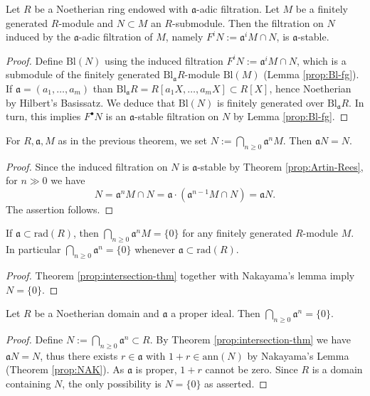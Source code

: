 \begin{theorem}\label{prop:Artin-Rees}
	Let $R$ be a Noetherian ring endowed with $\mathfrak{a}$-adic filtration. Let $M$ be a finitely generated $R$-module and $N \subset M$ an $R$-submodule. Then the filtration on $N$ induced by the $\mathfrak{a}$-adic filtration of $M$, namely $F^i N := \mathfrak{a}^i M \cap N$, is $\mathfrak{a}$-stable.
\end{theorem}
\begin{proof}
	Define $\text{Bl}(N)$ using the induced filtration $F^i N := \mathfrak{a}^i M \cap N$, which is a submodule of the finitely generated $\text{Bl}_{\mathfrak{a}} R$-module $\text{Bl}(M)$ (Lemma \ref{prop:Bl-fg}). If $\mathfrak{a} = (a_1, \ldots, a_m)$ than $\text{Bl}_{\mathfrak{a}} R = R[a_1 X, \ldots, a_m X] \subset R[X]$, hence Noetherian by Hilbert's Basissatz. We deduce that $\text{Bl}(N)$ is finitely generated over $\text{Bl}_{\mathfrak{a}} R$. In turn, this implies $F^\bullet N$ is an $\mathfrak{a}$-stable filtration on $N$ by Lemma \ref{prop:Bl-fg}.
\end{proof}

\begin{theorem}\label{prop:intersection-thm}
	For $R, \mathfrak{a}, M$ as in the previous theorem, we set $N := \bigcap_{n \geq 0} \mathfrak{a}^n M$. Then $\mathfrak{a}N = N$.
\end{theorem}
\begin{proof}
	Since the induced filtration on $N$ is $\mathfrak{a}$-stable by Theorem \ref{prop:Artin-Rees}, for $n \gg 0$ we have
	\[ N = \mathfrak{a}^n M \cap N = \mathfrak{a} \cdot (\mathfrak{a}^{n-1} M \cap N) = \mathfrak{a} N. \]
	The assertion follows.
\end{proof}

\begin{corollary}[Krull]\label{prop:Krull-intersection-rad}
	If $\mathfrak{a} \subset \mathrm{rad}(R)$, then $\bigcap_{n \geq 0} \mathfrak{a}^n M = \{0\}$ for any finitely generated $R$-module $M$. In particular $\bigcap_{n \geq 0} \mathfrak{a}^n = \{0\}$ whenever $\mathfrak{a} \subset \mathrm{rad}(R)$.
\end{corollary}
\begin{proof}
	Theorem \ref{prop:intersection-thm} together with Nakayama's lemma imply $N = \{0\}$.
\end{proof}

\begin{corollary}\label{prop:Krull-intersection-domain}
	Let $R$ be a Noetherian domain and $\mathfrak{a}$ a proper ideal. Then $\bigcap_{n \geq 0} \mathfrak{a}^n = \{0\}$.
\end{corollary}
\begin{proof}
	Define $N := \bigcap_{n \geq 0} \mathfrak{a}^n \subset R$. By Theorem \ref{prop:intersection-thm} we have $\mathfrak{a}N = N$, thus there exists $r \in \mathfrak{a}$ with $1+r \in \text{ann}(N)$ by Nakayama's Lemma (Theorem \ref{prop:NAK}). As $\mathfrak{a}$ is proper, $1+r$ cannot be zero. Since $R$ is a domain containing $N$, the only possibility is $N=\{0\}$ as asserted.
\end{proof}
